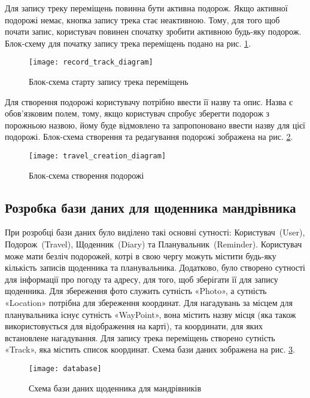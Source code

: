 \documentclass[../main.tex]{subfiles}
\begin{document}
Для запису треку переміщень повинна бути активна подорож. Якщо активної подорожі немає, кнопка запису трека стає неактивною. Тому, для того щоб почати запис, користувач повинен спочатку зробити активною будь-яку подорож. Блок-схему для початку запису трека переміщень подано на рис. \ref{diagram:start_tracking}.

\begin{figure}[H]
	\centering
	\texttt{[image: record\_track\_diagram]}
	\caption{Блок-схема старту запису трека переміщень}
	\label{diagram:start_tracking}
\end{figure}

Для створення подорожі користувачу потрібно ввести її назву та опис. Назва є обов'язковим полем, тому, якщо користувач спробує зберегти подорож з порожньою назвою, йому буде відмовлено та запропоновано ввести назву для цієї подорожі. Блок-схема створення та редагування подорожі зображена на рис. \ref{diagram:travel_creation}.

\begin{figure}[H]
	\centering
	\texttt{[image: travel\_creation\_diagram]}
	\caption{Блок-схема створення подорожі}
	\label{diagram:travel_creation}
\end{figure}

\subsection{Розробка бази даних для щоденника мандрівника}
При розробці бази даних було виділено такі основні сутності: Користувач~(User), Подорож~(Travel), Щоденник~(Diary) та Планувальник~(Reminder). Користувач може мати безліч подорожей, котрі в свою чергу можуть містити будь-яку кількість записів щоденника та планувальника. Додатково, було створено сутності для інформації про погоду та адресу, для того, щоб зберігати її для запису щоденника. Для збереження фото служить сутність «Photo», а сутність «Location» потрібна для збереження координат. Для нагадувань за місцем для планувальника існує сутність «WayPoint», вона містить назву місця (яка також використовується для відображення на карті), та  координати, для яких встановлене нагадування. Для запису трека переміщень створено сутність «Track», яка містить список координат. Схема бази даних зображена на рис. \ref{diagram:database}.

\begin{figure}[H]
	\centering
	\texttt{[image: database]}
	\caption{Схема бази даних щоденника для мандрівників}
	\label{diagram:database}
\end{figure}
\end{document}
